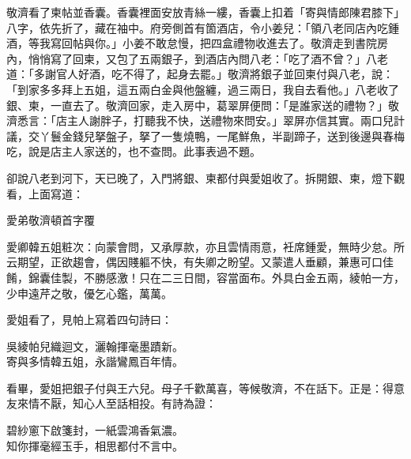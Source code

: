 敬濟看了柬帖並香囊。香囊裡面安放青絲一縷，香囊上扣着「寄與情郎陳君膝下」八字，{}依先折了，藏在袖中。府旁側首有箇酒店，令小姜兒：「領八老同店內吃鍾酒，等我寫回帖與你。」小姜不敢怠慢，把四盒禮物收進去了。敬濟走到書院房內，悄悄寫了回柬，又包了五兩銀子，到酒店內問八老：「吃了酒不曾？」八老道：「多謝官人好酒，吃不得了，起身去罷。」敬濟將銀子並回柬付與八老，說：「到家多多拜上五姐，這五兩白金與他盤纏，過三兩日，我自去看他。」八老收了銀、柬，一直去了。敬濟回家，走入房中，葛翠屏便問：「是誰家送的禮物？」敬濟悉言：「店主人謝胖子，打聽我不快，送禮物來問安。」翠屏亦信其實。兩口兒計議，交丫鬟金錢兒拏盤子，拏了一隻燒鴨，一尾鮮魚，半副蹄子，送到後邊與春梅吃，說是店主人家送的，也不查問。此事表過不題。

卻說八老到河下，天已晚了，入門將銀、柬都付與愛姐收了。拆開銀、柬，燈下觀看，上面寫道：

\begin{myquote}[\markfont]
愛弟敬濟頓首字覆

愛卿韓五姐粧次：向蒙會問，又承厚款，亦且雲情雨意，衽席鍾愛，無時少怠。所云期望，正欲趨會，偶因賤軀不快，有失卿之盼望。又蒙遣人垂顧，兼惠可口佳餚，錦囊佳製，不勝感激！只在二三日間，容當面布。外具白金五兩，綾帕一方，少申遠芹之敬，優乞心鑑，萬萬。

\end{myquote}

愛姐看了，見帕上寫着四句詩曰：

\begin{myquote}
吳綾帕兒織迴文，灑翰揮毫墨蹟新。\\寄與多情韓五姐，永諧鸞鳳百年情。
\end{myquote}

看畢，愛姐把銀子付與王六兒。母子千歡萬喜，等候敬濟，不在話下。正是：得意友來情不厭，知心人至話相投。有詩為證：

\begin{myquote}
碧紗窻下啟箋封，一紙雲鴻香氣濃。\\知你揮毫經玉手，相思都付不言中。
\end{myquote}

